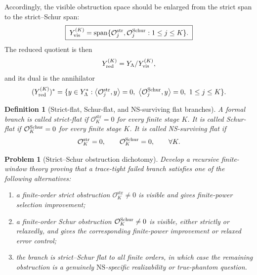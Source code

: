 \documentclass[11pt]{article}
\numberwithin{equation}{section}
\newtheorem{definition}[theorem]{Definition}
\newtheorem{problem}[theorem]{Problem}
\newcommand{\str}{\mathrm{str}}
\newcommand{\NS}{\mathrm{NS}}
\newcommand{\ip}[2]{\left\langle #1,#2\right\rangle}
\newcommand{\calO}{\mathcal O}
\begin{document}
Accordingly, the visible obstruction space should be enlarged from the strict span to the strict--Schur span:
\begin{equation}\label{eq:Yvis-str-Schur}
        \boxed{\;
        Y_{\rm vis}^{(K)}
        =\operatorname{span}\{\calO_j^{\str},\calO_j^{\rm Schur}:1\le j\le K\}.
        \;}
\end{equation}
The reduced quotient is then
\[
        Y_{\rm red}^{(K)}=Y_\Lambda/Y_{\rm vis}^{(K)},
\]
and its dual is the annihilator
\begin{equation}\label{eq:Yred-dual-str-Schur}
        (Y_{\rm red}^{(K)})^*
        =\{y\in Y_\Lambda^*:
        \ip{\calO_j^{\str}}{y}=0,
        \ \ip{\calO_j^{\rm Schur}}{y}=0,
        \ 1\le j\le K\}.
\end{equation}

\begin{definition}[Strict-flat, Schur-flat, and NS-surviving flat branches]\label{def:strict--Schur-flat}
A formal branch is called \emph{strict-flat} if \(\calO_K^{\str}=0\) for every finite stage \(K\).  It is called \emph{Schur-flat} if \(\calO_K^{\rm Schur}=0\) for every finite stage \(K\).  It is called \emph{NS-surviving flat} if
\begin{equation}\label{eq:NS-surviving-flat}
        \calO_K^{\str}=0,
        \qquad
        \calO_K^{\rm Schur}=0,
        \qquad
        \forall K.
\end{equation}
\end{definition}

\begin{problem}[Strict--Schur obstruction dichotomy]\label{prob:strict--Schur-dichotomy}
Develop a recursive finite-window theory proving that a trace-tight failed branch satisfies one of the following alternatives:
\begin{enumerate}[label=(\roman*)]
\item a finite-order strict obstruction \(\calO_K^{\str}\ne0\) is visible and gives finite-power selection improvement;
\item a finite-order Schur obstruction \(\calO_K^{\rm Schur}\ne0\) is visible, either strictly or relaxedly, and gives the corresponding finite-power improvement or relaxed error control;
\item the branch is strict--Schur flat to all finite orders, in which case the remaining obstruction is a genuinely \(\NS\)-specific realizability or true-phantom question.
\end{enumerate}
\end{problem}
\end{document}
